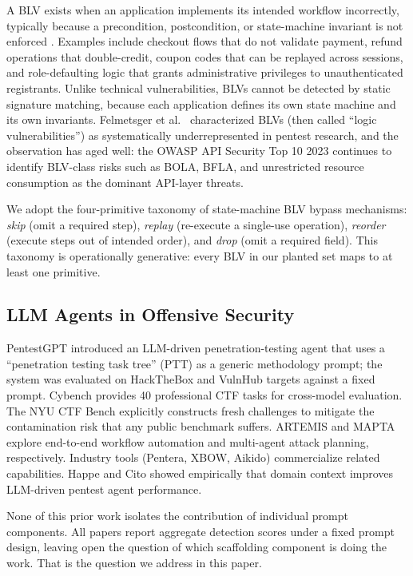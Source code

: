 \documentclass[conference]{IEEEtran}
\begin{document}
A BLV exists when an application implements its intended workflow incorrectly, typically because a precondition, postcondition, or state-machine invariant is not enforced \cite{felmetsger2010}. Examples include checkout flows that do not validate payment, refund operations that double-credit, coupon codes that can be replayed across sessions, and role-defaulting logic that grants administrative privileges to unauthenticated registrants. Unlike technical vulnerabilities, BLVs cannot be detected by static signature matching, because each application defines its own state machine and its own invariants. Felmetsger et al.\ \cite{felmetsger2010} characterized BLVs (then called ``logic vulnerabilities'') as systematically underrepresented in pentest research, and the observation has aged well: the OWASP API Security Top 10 2023 \cite{owasp_api2023} continues to identify BLV-class risks such as BOLA, BFLA, and unrestricted resource consumption as the dominant API-layer threats.

We adopt the four-primitive taxonomy of state-machine BLV bypass mechanisms: \emph{skip} (omit a required step), \emph{replay} (re-execute a single-use operation), \emph{reorder} (execute steps out of intended order), and \emph{drop} (omit a required field). This taxonomy is operationally generative: every BLV in our planted set maps to at least one primitive.

\subsection{LLM Agents in Offensive Security}

PentestGPT \cite{deng2024pentestgpt} introduced an LLM-driven penetration-testing agent that uses a ``penetration testing task tree'' (PTT) as a generic methodology prompt; the system was evaluated on HackTheBox and VulnHub targets against a fixed prompt. Cybench \cite{zhang2024cybench} provides 40 professional CTF tasks for cross-model evaluation. The NYU CTF Bench \cite{shao2024nyuctf} explicitly constructs fresh challenges to mitigate the contamination risk that any public benchmark suffers. ARTEMIS \cite{tan2024artemis} and MAPTA \cite{mayoral2024mapta} explore end-to-end workflow automation and multi-agent attack planning, respectively. Industry tools (Pentera, XBOW, Aikido) commercialize related capabilities. Happe and Cito \cite{happe2023getting} showed empirically that domain context improves LLM-driven pentest agent performance.

None of this prior work isolates the contribution of individual prompt components. All papers report aggregate detection scores under a fixed prompt design, leaving open the question of which scaffolding component is doing the work. That is the question we address in this paper.
\end{document}
